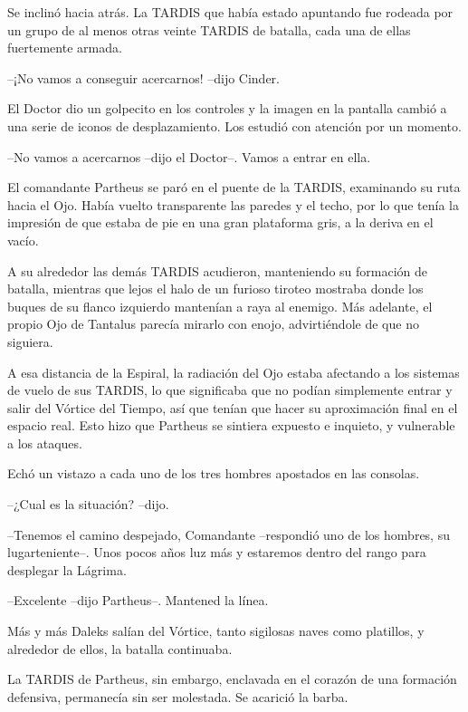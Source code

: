 Se inclinó hacia atrás. La TARDIS que había estado apuntando fue rodeada por un grupo de al menos otras veinte TARDIS de batalla, cada una de ellas fuertemente armada. 



--¡No vamos a conseguir acercarnos! --dijo Cinder.



El Doctor dio un golpecito en los controles y la imagen en la pantalla cambió a una serie de iconos de desplazamiento. Los estudió con atención por un momento. 



--No vamos a acercarnos --dijo el Doctor--. Vamos a entrar en ella.



El comandante Partheus se paró en el puente de la TARDIS, examinando su ruta hacia el Ojo. Había vuelto transparente las paredes y el techo, por lo que tenía la impresión de que estaba de pie en una gran plataforma gris, a la deriva en el vacío.

A su alrededor las demás TARDIS acudieron, manteniendo su formación de batalla, mientras que lejos el halo de un furioso tiroteo mostraba donde los buques de su flanco izquierdo mantenían a raya al enemigo. Más adelante, el propio Ojo de Tantalus parecía mirarlo con enojo, advirtiéndole de que no siguiera.

A esa distancia de la Espiral, la radiación del Ojo estaba afectando a los sistemas de vuelo de sus TARDIS, lo que significaba que no podían simplemente entrar y salir del Vórtice del Tiempo, así que tenían que hacer su aproximación final en el espacio real. Esto hizo que Partheus se sintiera expuesto e inquieto, y vulnerable a los ataques.

Echó un vistazo a cada uno de los tres hombres apostados en las consolas. 



--¿Cual es la situación? --dijo.

--Tenemos el camino despejado, Comandante --respondió uno de los hombres, su lugarteniente--. Unos pocos años luz más y estaremos dentro del rango para desplegar la Lágrima.

--Excelente --dijo Partheus--. Mantened la línea.



Más y más Daleks salían del Vórtice, tanto sigilosas naves como platillos, y alrededor de ellos, la batalla continuaba.

La TARDIS de Partheus, sin embargo, enclavada en el corazón de una formación defensiva, permanecía sin ser molestada. Se acarició la barba.

